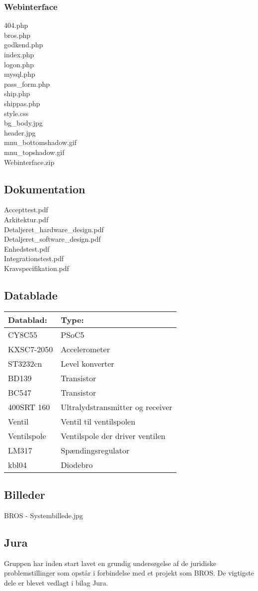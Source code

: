 \subsubsection*{Webinterface}
404.php\\
bros.php\\
godkend.php\\
index.php\\
logon.php\\
mysql.php\\
pass\_form.php\\
ship.php\\
shippas.php\\
style.css\\
bg\_body.jpg\\
header.jpg\\
mnu\_bottomshadow.gif\\
mnu\_topshadow.gif\\
Webinterface.zip\\


\subsection{Dokumentation}
Accepttest.pdf\\
Arkitektur.pdf\\
Detaljeret\_hardware\_design.pdf\\
Detaljeret\_software\_design.pdf\\
Enhedstest.pdf\\
Integrationstest.pdf\\
Kravspecifikation.pdf\\

\subsection{Datablade}
\begin{table}[H]
\begin{tabular}{ll}
\textbf{Datablad:}& \textbf{Type:} \\\hline
CY8C55\phantom{mmmmmm} & PSoC5 \\
KXSC7-2050& Accelerometer\\
ST3232cn & Level konverter \\
BD139 & Transistor \\
BC547 & Transistor \\
400SRT 160 & Ultralydstransmitter og receiver \\
Ventil & Ventil til ventilspolen \\
Ventilspole & Ventilspole der driver ventilen \\
LM317 & Spændingsregulator \\
kbl04 & Diodebro \\

\end{tabular}
\end{table}


\subsection{Billeder}
BROS - Systembillede.jpg\\

\subsection{Jura}
Gruppen har inden start lavet en grundig undersøgelse af de juridiske problemstillinger som opstår i forbindelse med et projekt som BROS. De vigtigste dele er blevet vedlagt i bilag Jura.